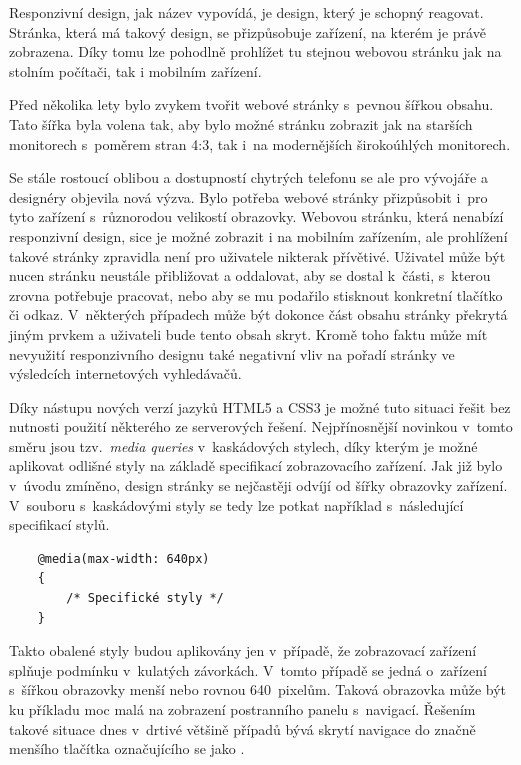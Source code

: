 Responzivní design, jak název vypovídá, je design, který je schopný reagovat. Stránka, která má takový design, se přizpůsobuje zařízení, na kterém je právě zobrazena. Díky tomu lze pohodlně prohlížet tu stejnou webovou stránku jak na stolním počítači, tak i mobilním zařízení. 

Před několika lety bylo zvykem tvořit webové stránky s~pevnou šířkou obsahu. Tato šířka byla volena tak, aby bylo možné stránku zobrazit jak na starších monitorech s~poměrem stran 4:3, tak i~na modernějších širokoúhlých monitorech. 

Se stále rostoucí oblibou a dostupností chytrých telefonu se ale pro vývojáře a designéry objevila nová výzva. Bylo potřeba webové stránky přizpůsobit i~pro tyto zařízení s~různorodou velikostí obrazovky. Webovou stránku, která nenabízí responzivní design, sice je možné zobrazit i na mobilním zařízením, ale prohlížení takové stránky zpravidla není pro uživatele nikterak přívětivé. Uživatel může být nucen stránku neustále přibližovat a oddalovat, aby se dostal k~části, s~kterou zrovna potřebuje pracovat, nebo aby se mu podařilo stisknout konkretní tlačítko či odkaz. V~některých případech může být dokonce část obsahu stránky překrytá jiným prvkem a uživateli bude tento obsah skryt. Kromě toho faktu může mít nevyužití responzivního designu také negativní vliv na pořadí stránky ve výsledcích internetových vyhledávačů.

Díky nástupu nových verzí jazyků HTML5 a CSS3 je možné tuto situaci řešit bez nutnosti použití některého ze serverových řešení. Nejpřínosnější novinkou v~tomto směru jsou tzv.~\emph{media queries} v~kaskádových stylech, díky kterým je možné aplikovat odlišné styly na základě specifikací zobrazovacího zařízení. Jak již bylo v~úvodu zmíněno, design stránky se nejčastěji odvíjí od šířky obrazovky zařízení. V~souboru s~kaskádovými styly se tedy lze potkat například s~následující specifikací stylů.

\begin{verbatim}
    @media(max-width: 640px)
    {
        /* Specifické styly */
    }
\end{verbatim}

Takto obalené styly budou aplikovány jen v~případě, že zobrazovací zařízení splňuje podmínku v~kulatých závorkách. V~tomto případě se jedná o~zařízení s~šířkou obrazovky menší nebo rovnou 640~pixelům. Taková obrazovka může být ku příkladu moc malá na zobrazení postranního panelu s~navigací. Řešením takové situace dnes v~drtivé většině případů bývá skrytí navigace do značně menšího tlačítka označujícího se jako .

